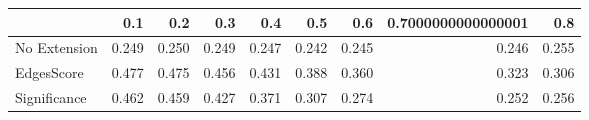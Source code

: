 \begin{tabular}{lrrrrrrrr}
\toprule
{} &   0.1 &   0.2 &   0.3 &   0.4 &   0.5 &   0.6 & 0.7000000000000001 &   0.8 \\
\midrule
No Extension & 0.249 & 0.250 & 0.249 & 0.247 & 0.242 & 0.245 &              0.246 & 0.255 \\
EdgesScore   & 0.477 & 0.475 & 0.456 & 0.431 & 0.388 & 0.360 &              0.323 & 0.306 \\
Significance & 0.462 & 0.459 & 0.427 & 0.371 & 0.307 & 0.274 &              0.252 & 0.256 \\
\bottomrule
\end{tabular}
